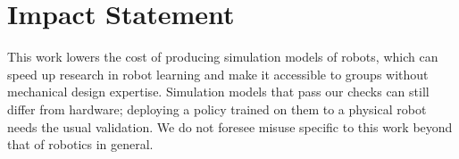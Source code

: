 \section*{Impact Statement}

This work lowers the cost of producing simulation models of robots, which can speed up research in
robot learning and make it accessible to groups without mechanical design expertise. Simulation
models that pass our checks can still differ from hardware; deploying a policy trained on them to a
physical robot needs the usual validation. We do not foresee misuse specific to this work beyond
that of robotics in general.
